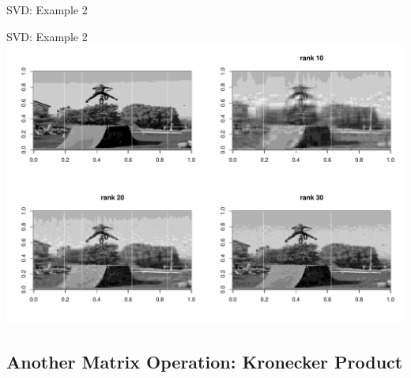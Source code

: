 \documentclass[
  ignorenonframetext,
]{beamer}
\newenvironment{Shaded}{\begin{snugshade}}{\end{snugshade}}
\newcommand{\AttributeTok}[1]{\textcolor[rgb]{0.77,0.63,0.00}{#1}}
\newcommand{\DecValTok}[1]{\textcolor[rgb]{0.00,0.00,0.81}{#1}}
\newcommand{\FunctionTok}[1]{\textcolor[rgb]{0.00,0.00,0.00}{#1}}
\newcommand{\NormalTok}[1]{#1}
\newcommand{\OtherTok}[1]{\textcolor[rgb]{0.56,0.35,0.01}{#1}}
\newcommand{\SpecialCharTok}[1]{\textcolor[rgb]{0.00,0.00,0.00}{#1}}
\newcommand{\StringTok}[1]{\textcolor[rgb]{0.31,0.60,0.02}{#1}}
\begin{document}
\begin{frame}[fragile]{SVD: Example 2}
\begin{Shaded}
\end{Shaded}
\end{frame}

\begin{frame}{SVD: Example 2}
\protect\hypertarget{svd-example-2-1}{}
\includegraphics{Lecture02_MatrixOperations_files/figure-beamer/unnamed-chunk-23-1.pdf}
\end{frame}

\hypertarget{another-matrix-operation-kronecker-product}{%
\subsection{Another Matrix Operation: Kronecker
Product}\label{another-matrix-operation-kronecker-product}}
\end{document}
